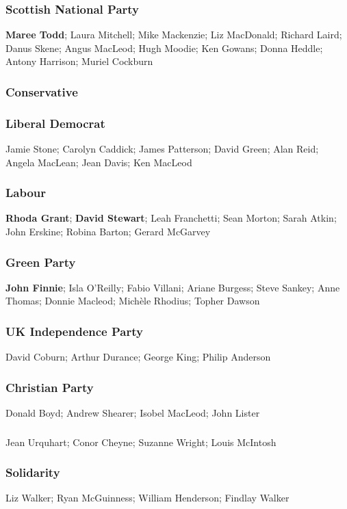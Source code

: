 \begin{resultsiii}
\subsubsection*{Scottish National Party}
\textbf{Maree Todd}; Laura Mitchell; Mike Mackenzie; Liz MacDonald; Richard Laird; Danus Skene; Angus MacLeod; Hugh Moodie; Ken Gowans; Donna Heddle; Antony Harrison; Muriel Cockburn
\subsubsection*{Conservative}
\subsubsection*{Liberal Democrat}
Jamie Stone; Carolyn Caddick; James Patterson; David Green; Alan Reid; Angela MacLean; Jean Davis; Ken MacLeod
\subsubsection*{Labour}
\textbf{Rhoda Grant}; \textbf{David Stewart}; Leah Franchetti; Sean Morton; Sarah Atkin; John Erskine; Robina Barton; Gerard McGarvey
\subsubsection*{Green Party}
\textbf{John Finnie}; Isla O'Reilly; Fabio Villani; Ariane Burgess; Steve Sankey; Anne Thomas; Donnie Macleod; Michèle Rhodius; Topher Dawson
\subsubsection*{UK Independence Party}
David Coburn; Arthur Durance; George King; Philip Anderson
\subsubsection*{Christian Party}
Donald Boyd; Andrew Shearer; Isobel MacLeod; John Lister
\subsubsection*{\RISE}
Jean Urquhart; Conor Cheyne; Suzanne Wright; Louis McIntosh
\subsubsection*{Solidarity}
Liz Walker; Ryan McGuinness; William Henderson; Findlay Walker
\end{resultsiii}

